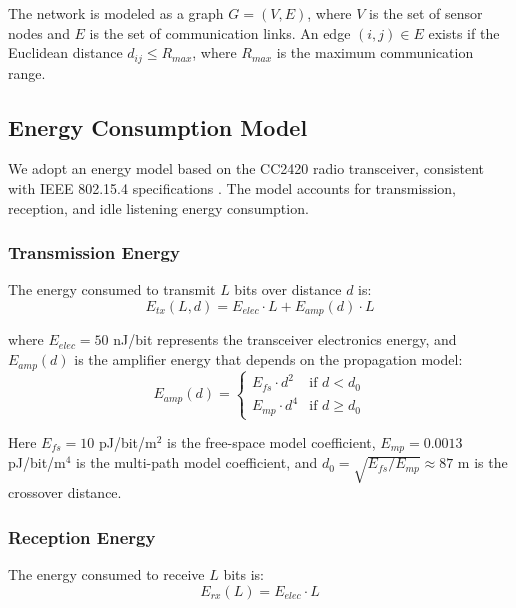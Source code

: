 The network is modeled as a graph $G = (V, E)$, where $V$ is the set of
sensor nodes and $E$ is the set of communication links. An edge $(i, j)
\in E$ exists if the Euclidean distance $d_{ij} \leq R_{max}$, where
$R_{max}$ is the maximum communication range.

\subsection{Energy Consumption Model}

We adopt an energy model based on the CC2420 radio transceiver, consistent
with IEEE 802.15.4 specifications \cite{cc2420datasheet}. The model accounts
for transmission, reception, and idle listening energy consumption.

\subsubsection{Transmission Energy}

The energy consumed to transmit $L$ bits over distance $d$ is:
\begin{equation}
E_{tx}(L, d) = E_{elec} \cdot L + E_{amp}(d) \cdot L
\label{eq:tx_energy}
\end{equation}

where $E_{elec} = 50$ nJ/bit represents the transceiver electronics energy,
and $E_{amp}(d)$ is the amplifier energy that depends on the propagation
model:
\begin{equation}
E_{amp}(d) = \begin{cases}
    E_{fs} \cdot d^2 & \text{if } d < d_0 \\
    E_{mp} \cdot d^4 & \text{if } d \geq d_0
\end{cases}
\label{eq:amp_energy}
\end{equation}

Here $E_{fs} = 10$ pJ/bit/m$^2$ is the free-space model coefficient,
$E_{mp} = 0.0013$ pJ/bit/m$^4$ is the multi-path model coefficient, and
$d_0 = \sqrt{E_{fs}/E_{mp}} \approx 87$ m is the crossover distance.

\subsubsection{Reception Energy}

The energy consumed to receive $L$ bits is:
\begin{equation}
E_{rx}(L) = E_{elec} \cdot L
\label{eq:rx_energy}
\end{equation}

